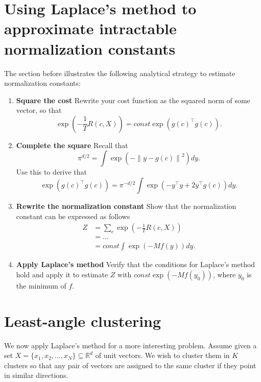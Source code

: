 \section{Using Laplace's method to approximate intractable normalization constants}
\label{sec:laplace_recipe}

The section before illustrates the following analytical strategy to estimate normalization constants:

\begin{enumerate}
\item \textbf{Square the cost} Rewrite your cost function as the squared norm of some vector, so that
%
\begin{equation}
\exp\left(-\frac{1}{T}R(c, X)\right) = \mathit{const}\exp\left(g(c)^\top g(c)\right).
\end{equation}
%
\item \textbf{Complete the square} Recall that
%
\begin{equation}
\pi^{d/2} = \int \exp\left(-\left\|y - g(c)\right\|^2\right) dy.
\end{equation}
%
Use this to derive that
%
\begin{equation}
\exp\left(g(c)^\top g(c)\right) = \pi^{-d/2}\int \exp\left(-y^\top y + 2y^\top g(c)\right)dy.
\end{equation}
%
\item \textbf{Rewrite the normalization constant} Show that the normalization constant can be expressed as follows
%
\begin{align}
Z &= \sum_{c} \exp\left(-\frac{1}{T}R(c, X)\right)\\ 
&= \ldots\\
&= \mathit{const} \int \exp\left(-M f(y)\right)dy.
\end{align}
%

\item \textbf{Apply Laplace's method} Verify that the conditions for Laplace's method hold and apply it to estimate $Z$ with $\mathit{const}\exp\left(-M f(y_0)\right)$, where $y_0$ is the minimum of $f$.
\end{enumerate}

\section{Least-angle clustering}

We now apply Laplace's method for a more interesting problem.
Assume given a set $X = \{x_1, x_2, \ldots, x_N\} \subseteq \mathbb{R}^d$ of unit vectors. We wish to cluster them in $K$ clusters so that any pair of vectors are assigned to the same cluster if they point in similar directions.

